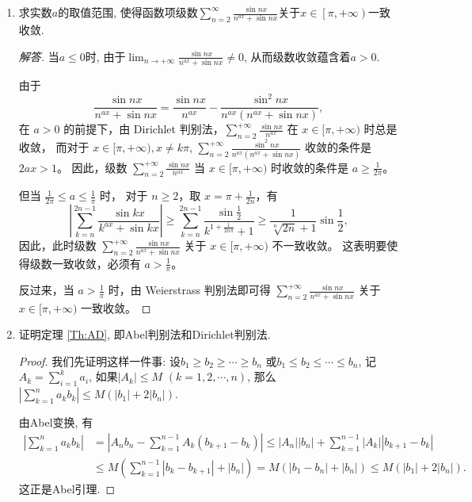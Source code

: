 \begin{quiza}
\begin{enumerate}
\begin{proof}[解答]
考虑级数\(\sum_{n=20}^{+\infty}\frac{(-1)^nx}{n^{ax}}\), 
由Dirichlet判别法可知其在题设范围内一致收敛. 于是
\[\frac{(-1)^nx}{n^{ax}}-\frac{(-1)^nx}{n^{ax}+(-1)^nx}
=\frac{x}{n^{ax}(n^{ax}+(-1)^nx)}\sim\frac{x}{n^{2ax}},\]
由此知当且仅当\(a>\frac{1}{2}\)时原级数关于\(x\in\left[1,+\infty\right)\)一致收敛. 
\end{proof}
\item 求实数\(a\)的取值范围, 使得函数项级数\(\sum_{n=2}^{\infty}\frac{\sin nx}{n^{ax}+\sin nx}\)关于\(x\in\left[\pi,+\infty\right)\)一致收敛.
\begin{proof}[解答]
当\(a\leqslant 0\)时, 由于\(\lim_{n\rightarrow+\infty}\frac{\sin nx}{n^{ax}+\sin nx}\ne 0\), 从而级数收敛蕴含着\(a>0\).

由于
\[\frac{\sin nx}{n^{ax}+\sin nx}=\frac{\sin nx}{n^{ax}}-\frac{\sin^2 nx}{n^{ax}(n^{ax}+\sin nx)},\]
在 $a>0$ 的前提下，由 Dirichlet 判别法，\(\sum_{n=2}^{+\infty} \frac{\sin nx}{n^{ax}}\) 在 $x \in[\pi,+\infty)$ 时总是收敛，
而对于 $x \in[\pi,+\infty), x \neq k\pi$, \(\sum_{n=2}^{+\infty} \frac{\sin^2 nx}{n^{ax}(n^{ax}+\sin nx)}\) 收敛的条件是 $2ax>1$。
因此，级数 \(\sum_{n=2}^{+\infty} \frac{\sin nx}{n^{ax}}\) 当 $x \in[\pi,+\infty)$ 时收敛的条件是 \(a \geqslant \frac{1}{2\pi}\)。

但当 \(\frac{1}{2\pi} \leqslant a \leqslant \frac{1}{\pi}\) 时，
对于 $n \geqslant 2$，取 \(x=\pi+\frac{1}{2n}\)，有
\[\left|\sum_{k=n}^{2n-1} \frac{\sin kx}{k^{ax}+\sin kx}\right| 
\geqslant \sum_{k=n}^{2n-1} \frac{\sin \frac{1}{2}}{k^{1+\frac{1}{2n\pi}}+1} 
\geqslant \frac{1}{\sqrt[n]{2n}+1} \sin \frac{1}{2},\]
因此，此时级数 \(\sum_{n=2}^{+\infty} \frac{\sin nx}{n^{ax}+\sin nx}\) 关于 $x \in[\pi,+\infty)$ 不一致收敛。
这表明要使得级数一致收敛，必须有 \(a>\frac{1}{\pi}\)。

反过来，当 \(a>\frac{1}{\pi}\) 时，由 Weierstrass 判别法即可得 \(\sum_{n=2}^{+\infty} \frac{\sin nx}{n^{ax}+\sin nx}\) 关于 $x \in[\pi,+\infty)$ 一致收敛。
\end{proof}
\item 证明定理 \ref{Th:AD}, 即Abel判别法和Dirichlet判别法.
\begin{proof}
我们先证明这样一件事: 设\(b_1\geqslant b_2\geqslant\cdots\geqslant b_n\)
或\(b_1\leqslant b_2\leqslant\cdots\leqslant b_n\), 记\(A_k=\sum_{i=1}^{k}a_i\), 
如果\(|A_k|\leqslant M\) \((k=1,2,\cdots,n)\), 
那么\(\left|\sum_{k=1}^{n}a_kb_k\right|\leqslant M(|b_1|+2|b_n|)\).

由Abel变换, 有\[\begin{split}
\left|\sum_{k=1}^{n}a_kb_k\right|
&=\left|A_nb_n-\sum_{k=1}^{n-1}A_k(b_{k+1}-b_k)\right|
\leqslant\left|A_n\right|\left|b_n\right|
+\sum_{k=1}^{n-1}\left|A_k\right|\left|b_{k+1}-b_k\right|\\
&\leqslant M\left(\sum_{k=1}^{n-1}\left|b_k-b_{k+1}\right|+|b_n|\right)
= M(|b_1-b_n|+|b_n|)\leqslant M(|b_1|+2|b_n|).
\end{split}\]这正是Abel引理. 


\end{proof}
\end{enumerate}
\end{quiza}
